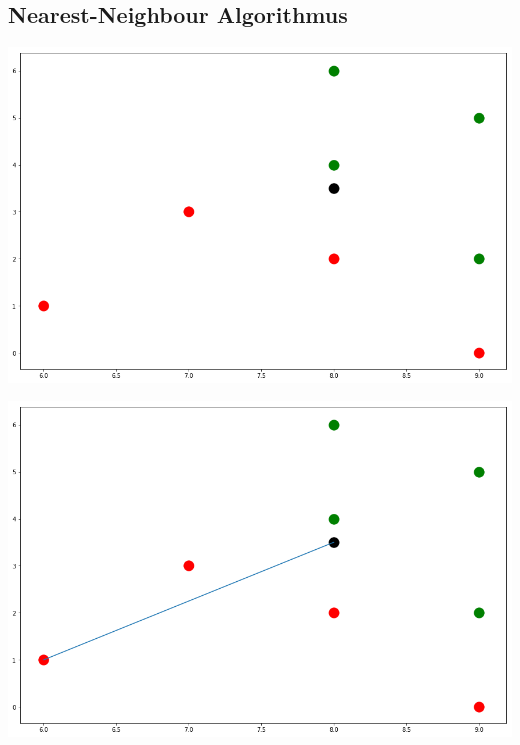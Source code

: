 \documentclass[fontsize=11pt]{scrartcl}
\newenvironment{Figure}
  {\par\medskip\noindent\minipage{\linewidth}}
  {\endminipage\par\medskip}
\begin{document}
            \subsection{Nearest-Neighbour Algorithmus}
                \begin{Figure}
                    \begin{minipage}[b]{.4\linewidth}
                        \includegraphics[scale=0.2]{nn1.png}
                    \end{minipage}
                    \hspace{.1\linewidth}
                    \begin{minipage}[b]{.4\linewidth}
                        \includegraphics[scale=0.2]{nn2.png}
                    \end{minipage}

\end{Figure}
\end{document}
